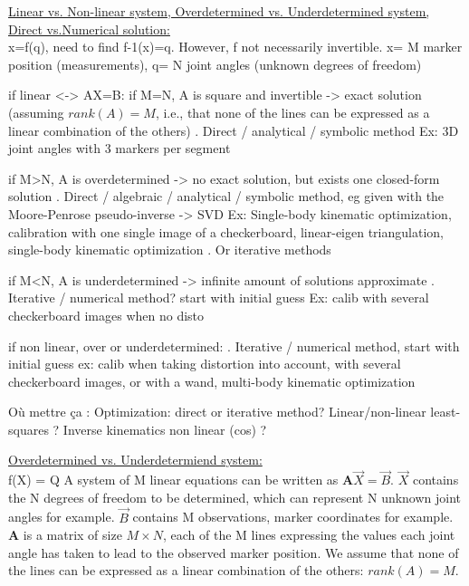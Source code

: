 \vspace*{0.5cm}

\noindent\underline{Linear vs. Non-linear system, Overdetermined vs. Underdetermined system, \\Direct vs.Numerical solution:}\\


x=f(q), need to find f-1(x)=q. However, f not necessarily invertible. x= M marker position (measurements), q= N joint angles (unknown degrees of freedom)

if linear <-> AX=B: 
      if M=N, A is square and invertible -> exact solution (assuming $rank(A)=M$, i.e., that none of the lines can be expressed as a linear combination of the others)
      . Direct / analytical / symbolic method
      Ex: 3D joint angles with 3 markers per segment

      if M>N, A is overdetermined -> no exact solution, but exists one closed-form solution 
      . Direct / algebraic / analytical / symbolic method, eg given with the Moore-Penrose pseudo-inverse -> SVD  
      Ex: Single-body kinematic optimization, calibration with one single image of a checkerboard, linear-eigen triangulation, single-body kinematic optimization
      . Or iterative methods

      if M<N, A is underdetermined -> infinite amount of solutions approximate
      . Iterative / numerical method? start with initial guess
      Ex: calib with several checkerboard images when no disto

if non linear, over or underdetermined:
      . Iterative / numerical method, start with initial guess
      ex: calib when taking distortion into account, with several checkerboard images, or with a wand, 
      multi-body kinematic optimization


Où mettre ça :
      Optimization: direct or iterative method?
      Linear/non-linear least-squares ?
      Inverse kinematics non linear (cos) ?
      



\vspace*{0.5cm}

\noindent\underline{Overdetermined vs. Underdetermiend system:}\\
f(X) = Q
A system of M linear equations can be written as $\textbf{A} \overrightarrow{X}=\overrightarrow{B}$. $\overrightarrow{X}$ contains the N degrees of freedom to be determined, which can represent N unknown joint angles for example. $\overrightarrow{B}$ contains M observations, marker coordinates for example. \textbf{A} is a matrix of size $M \times N$, each of the M lines expressing the values each joint angle has taken to lead to the observed marker position. We assume that none of the lines can be expressed as a linear combination of the others: $rank(A)=M$.

